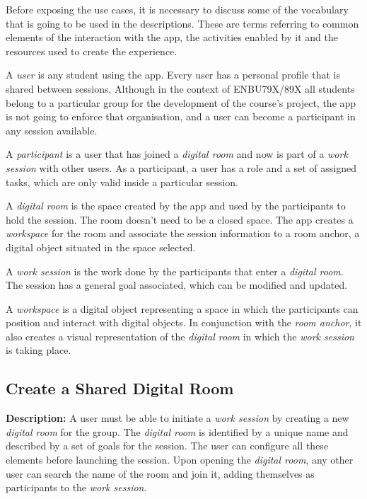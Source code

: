 Before exposing the use cases, it is necessary to discuss some of the vocabulary that is going to be used in the descriptions. These are terms referring to common elements
of the interaction with the app, the activities enabled by it and the resources used to create the experience.

A \emph{user} is any student using the app. Every user has a personal profile that is shared between sessions. Although in the context of ENBU79X/89X all students belong
to a particular group for the development of the course's project, the app is not going to enforce that organisation, and a user can become a participant in any session
available.

A \emph{participant} is a user that has joined a \emph{digital room} and now is part of a \emph{work session} with other users. As a participant, a user has a role and a set of assigned
tasks, which are only valid inside a particular session.

A \emph{digital room} is the space created by the app and used by the participants to hold the session. The room doesn't need to be a closed space. The app creates a
\emph{workspace} for the room and associate the session information to a room anchor, a digital object situated in the space selected.

A \emph{work session} is the work done by the participants that enter a \emph{digital room}. The session has a general goal associated, which can be modified and updated.

A \emph{workspace} is a digital object representing a space in which the participants can position and interact with digital objects. In conjunction with the \emph{room anchor},
it also creates a visual representation of the \emph{digital room} in which the \emph{work session} is taking place.

\subsection{Create a Shared Digital Room \label{sec:4-2-1}}

\textbf{Description:} A user must be able to initiate a \emph{work session} by creating a new \emph{digital room} for the group. The \emph{digital room} is identified by a unique
name and described by a set of goals for the session. The user can configure all these elements before launching the session. Upon opening the \emph{digital room}, any
other user can search the name of the room and join it, adding themselves as participants to the \emph{work session}.

